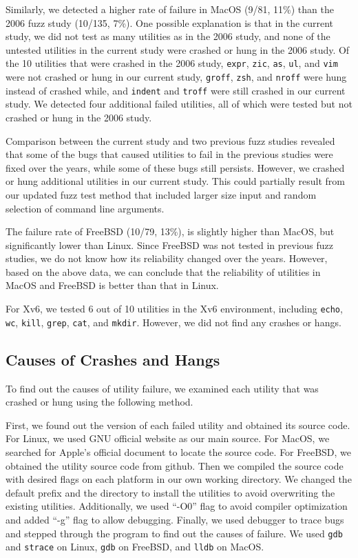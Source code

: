 Similarly, we detected a higher rate of failure in MacOS (9/81, 11\%) than the 2006 fuzz study (10/135, 7\%). One possible explanation is that in the current study, we did not test as many utilities as in the 2006 study, and none of the untested utilities in the current study were crashed or hung in the 2006 study. Of the 10 utilities that were crashed in the 2006 study, \texttt{expr}, \texttt{zic}, \texttt{as}, \texttt{ul}, and \texttt{vim} were not crashed or hung in our current study, \texttt{groff}, \texttt{zsh}, and \texttt{nroff} were hung instead of crashed while, and \texttt{indent} and \texttt{troff} were still crashed in our current study. We detected four additional failed utilities, all of which were tested but not crashed or hung in the 2006 study.

Comparison between the current study and two previous fuzz studies revealed that some of the bugs that caused utilities to fail in the previous studies were fixed over the years, while some of these bugs still persists. However, we crashed or hung additional utilities in our current study. This could partially result from our updated fuzz test method that included larger size input and random selection of command line arguments.

The failure rate of FreeBSD (10/79, 13\%), is slightly higher than MacOS, but significantly lower than Linux. Since FreeBSD was not tested in previous fuzz studies, we do not know how its reliability changed over the years. However, based on the above data, we can conclude that the reliability of utilities in MacOS and FreeBSD is better than that in Linux.

For Xv6, we tested 6 out of 10 utilities in the Xv6 environment, including \texttt{echo}, \texttt{wc}, \texttt{kill}, \texttt{grep}, \texttt{cat}, and \texttt{mkdir}. However, we did not find any crashes or hangs.



\subsection{Causes of Crashes and Hangs}
To find out the causes of utility failure, we examined each utility that was crashed or hung using the following method. 

First, we found out the version of each failed utility and obtained its source code. For Linux, we used GNU official website as our main source. For MacOS, we searched for Apple’s official document to locate the source code. For FreeBSD, we obtained the utility source code from github. Then we compiled the source code with desired flags on each platform in our own working directory. We changed the default prefix and the directory to install the utilities to avoid overwriting the existing utilities. Additionally, we used “-O0” flag to avoid compiler optimization and added “-g” flag to allow debugging. Finally, we used debugger to trace bugs and stepped through the program to find out the causes of failure. We used \texttt{gdb} and \texttt{strace} on Linux, \texttt{gdb} on FreeBSD, and \texttt{lldb} on MacOS. 

